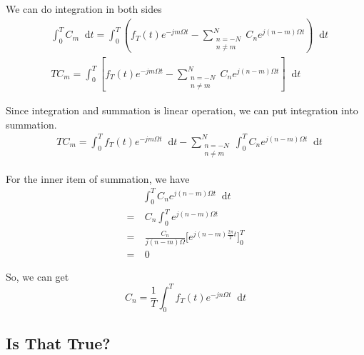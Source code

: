 \documentclass[margin,line]{res}
\newcommand*{\dif}{\mathop{}\!\mathrm{d}}
\begin{document}
\begin{resume}
We can do integration in both sides
\begin{align}
&\int_{0}^{T}{C_m\dif t}=\int_{0}^{T}{(f_T(t) e^{-jm\Omega t}-
	\sum\limits_{ \substack{n=-N \\ n\neq m} }^{N}{C_n e^{j(n-m)\Omega t}})
	\dif t} \nonumber \\
&TC_m=\int_{0}^{T}{[f_T(t) e^{-jm\Omega t}-
	\sum\limits_{ \substack{n=-N \\ n\neq m} }^{N}{C_n e^{j(n-m)\Omega t}}]
	\dif t} \nonumber
\end{align}

Since integration and summation is linear operation, we can put integration into summation.
\begin{align}
	&TC_m=\int_{0}^{T}{f_T(t) e^{-jm\Omega t}} \dif t -
		\sum\limits_{ \substack{n=-N \\ n\neq m} }^{N}{
			\int_{0}^{T}C_n e^{j(n-m)\Omega t} \dif t
		} \nonumber
\end{align}

For the inner item of summation, we have
\begin{align}
&\int_{0}^{T}{C_n e^{j(n-m)\Omega t} \dif t } \nonumber \\
=&\ C_n\int_{0}^{T} e^{j(n-m)\Omega t} \nonumber \\
=&\ \frac{C_n}{j(n-m)\Omega} \Big[ e^{ j(n-m) \frac{2\pi}{T} t} \Big]_{0}^{T} \nonumber \\
=&\ 0 \nonumber
\end{align}

So, we can get
$$
C_n=\frac{1}{T}\int_0^T{f_T(t) e^{-jn\Omega t} \dif t}
$$

\subsection{\textbf{Is That True?}}


\end{resume}
\end{document}
